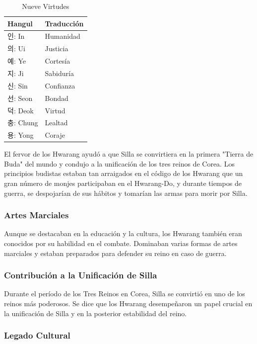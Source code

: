 \begin{table}[t]
	\caption{Nueve Virtudes}
	\begin{center}
		\begin{tabular}{ | m{2cm} | m{5cm} | }
			\hline Hangul & Traducción \\ \hline
			인: In & Humanidad \\
			의: Ui & Justicia \\
			예: Ye & Cortesía \\
			지: Ji & Sabiduría \\
			신: Sin & Confianza \\
			선: Seon & Bondad \\
			덕: Deok & Virtud \\
			충: Chung & Lealtad \\
			용: Yong & Coraje \\

			\hline
		\end{tabular}
	\end{center}
\end{table}


El fervor de los Hwarang ayudó a que Silla se convirtiera en la primera "Tierra de Buda" del mundo y condujo a la unificación de los tres reinos de Corea. Los principios budistas estaban tan arraigados en el código de los Hwarang que un gran número de monjes participaban en el Hwarang-Do, y durante tiempos de guerra, se despojarían de sus hábitos y tomarían las armas para morir por Silla.

\subsubsection{Artes Marciales}

Aunque se destacaban en la educación y la cultura, los Hwarang también eran conocidos por su habilidad en el combate. Dominaban varias formas de artes marciales y estaban preparados para defender su reino en caso de guerra.

\subsubsection{Contribución a la Unificación de Silla}

Durante el período de los Tres Reinos en Corea, Silla se convirtió en uno de los reinos más poderosos. Se dice que los Hwarang desempeñaron un papel crucial en la unificación de Silla y en la posterior estabilidad del reino.

\subsubsection{Legado Cultural}

